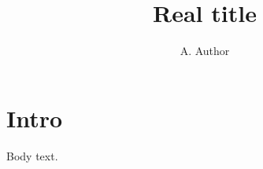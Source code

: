 \documentclass[epjCONF]{svjour}
\begin{document}
\title{Real title}
\author{A. Author}
\maketitle
\section{Intro}
Body text.
\end{document}
